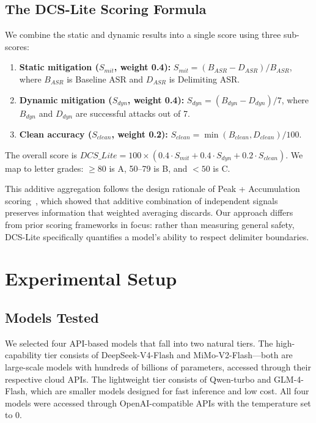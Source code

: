 \documentclass[journal]{IEEEtran}
\begin{document}
\subsection{The DCS-Lite Scoring Formula}
We combine the static and dynamic results into a single score using three sub-scores:

\begin{enumerate}
    \item \textbf{Static mitigation ($S_{mit}$, weight 0.4):} $S_{mit} = (B_{ASR} - D_{ASR}) / B_{ASR}$, where $B_{ASR}$ is Baseline ASR and $D_{ASR}$ is Delimiting ASR.
    \item \textbf{Dynamic mitigation ($S_{dyn}$, weight 0.4):} $S_{dyn} = (B_{dyn} - D_{dyn}) / 7$, where $B_{dyn}$ and $D_{dyn}$ are successful attacks out of 7.
    \item \textbf{Clean accuracy ($S_{clean}$, weight 0.2):} $S_{clean} = \min(B_{clean}, D_{clean}) / 100$.
\end{enumerate}

The overall score is $DCS\_Lite = 100 \times (0.4 \cdot S_{mit} + 0.4 \cdot S_{dyn} + 0.2 \cdot S_{clean})$. We map to letter grades: $\geq 80$ is A, 50--79 is B, and $<50$ is C.

This additive aggregation follows the design rationale of Peak + Accumulation scoring~\cite{corll2026peak}, which showed that additive combination of independent signals preserves information that weighted averaging discards. Our approach differs from prior scoring frameworks in focus: rather than measuring general safety, DCS-Lite specifically quantifies a model's ability to respect delimiter boundaries.

\section{Experimental Setup}

\subsection{Models Tested}
We selected four API-based models that fall into two natural tiers. The high-capability tier consists of DeepSeek-V4-Flash and MiMo-V2-Flash---both are large-scale models with hundreds of billions of parameters, accessed through their respective cloud APIs. The lightweight tier consists of Qwen-turbo and GLM-4-Flash, which are smaller models designed for fast inference and low cost. All four models were accessed through OpenAI-compatible APIs with the temperature set to 0.
\end{document}
